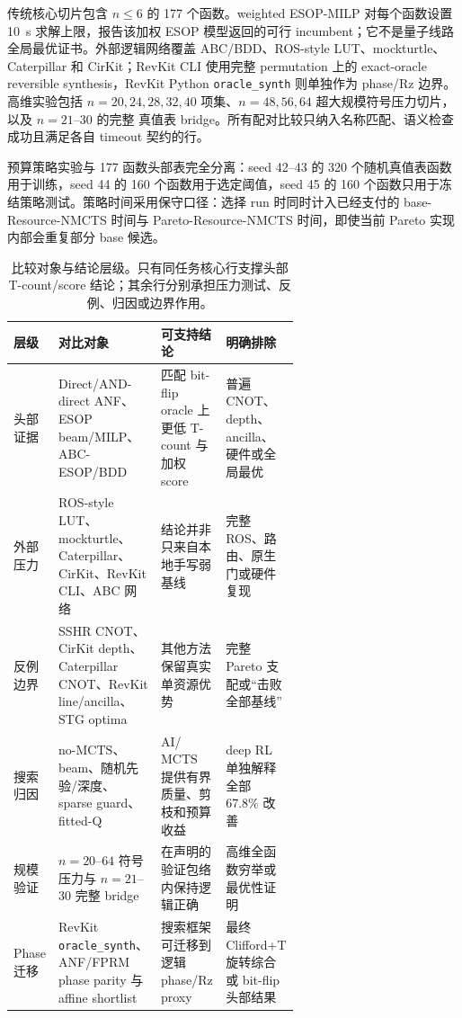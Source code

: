 \documentclass[UTF8,fontset=macnew,11pt]{ctexart}
\newcommand{\method}{Resource-NMCTS}
\newcommand{\mcts}{\ensuremath{\mathrm{MCTS}}}
\newcommand{\ttable}{真值表}
\begin{document}
传统核心切片包含 $n\leq6$ 的 177 个函数。weighted ESOP-MILP 对每个函数设置 10~s 求解上限，报告该加权 ESOP 模型返回的可行 incumbent；它不是量子线路全局最优证书。外部逻辑网络覆盖 ABC/BDD、ROS-style LUT、mockturtle、Caterpillar 和 CirKit；RevKit CLI 使用完整 permutation 上的 exact-oracle reversible synthesis，RevKit Python \texttt{oracle\_synth} 则单独作为 phase/Rz 边界。高维实验包括 $n=20,24,28,32,40$ 项集、$n=48,56,64$ 超大规模符号压力切片，以及 $n=21$--$30$ 的完整 \ttable{} bridge。所有配对比较只纳入名称匹配、语义检查成功且满足各自 timeout 契约的行。

预算策略实验与 177 函数头部表完全分离：seed 42--43 的 320 个随机真值表函数用于训练，seed 44 的 160 个函数用于选定阈值，seed 45 的 160 个函数只用于冻结策略测试。策略时间采用保守口径：选择 run 时同时计入已经支付的 base-\method{} 时间与 Pareto-\method{} 时间，即使当前 Pareto 实现内部会重复部分 base 候选。

\begin{table}[H]
\centering
\tiny
\setlength{\tabcolsep}{2.2pt}
\renewcommand{\arraystretch}{1.05}
\caption{比较对象与结论层级。只有同任务核心行支撑头部 T-count/score 结论；其余行分别承担压力测试、反例、归因或边界作用。}
\label{tab:claim-hierarchy-zh}
\begin{tabularx}{\linewidth}{>{\raggedright\arraybackslash}p{0.13\linewidth}>{\raggedright\arraybackslash}p{0.26\linewidth}>{\raggedright\arraybackslash}X>{\raggedright\arraybackslash}p{0.24\linewidth}}
\toprule
层级 & 对比对象 & 可支持结论 & 明确排除 \\
\midrule
头部证据 & Direct/AND-direct ANF、ESOP beam/MILP、ABC-ESOP/BDD & 匹配 bit-flip oracle 上更低 T-count 与加权 score & 普遍 CNOT、depth、ancilla、硬件或全局最优 \\
外部压力 & ROS-style LUT、mockturtle、Caterpillar、CirKit、RevKit CLI、ABC 网络 & 结论并非只来自本地手写弱基线 & 完整 ROS、路由、原生门或硬件复现 \\
反例边界 & SSHR CNOT、CirKit depth、Caterpillar CNOT、RevKit line/ancilla、STG optima & 其他方法保留真实单资源优势 & 完整 Pareto 支配或“击败全部基线” \\
搜索归因 & no-\mcts{}、beam、随机先验/深度、sparse guard、fitted-Q & AI/\mcts{} 提供有界质量、剪枝和预算收益 & deep RL 单独解释全部 67.8\% 改善 \\
规模验证 & $n=20$--$64$ 符号压力与 $n=21$--$30$ 完整 bridge & 在声明的验证包络内保持逻辑正确 & 高维全函数穷举或最优性证明 \\
Phase 迁移 & RevKit \texttt{oracle\_synth}、ANF/FPRM phase parity 与 affine shortlist & 搜索框架可迁移到逻辑 phase/Rz proxy & 最终 Clifford+T 旋转综合或 bit-flip 头部结果 \\
\bottomrule
\end{tabularx}
\end{table}
\end{document}
